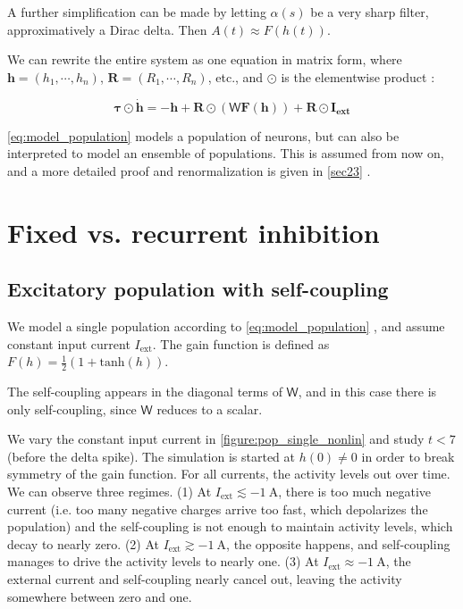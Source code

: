 \documentclass[10pt,conference,compsocconf,a4paper]{IEEEtran}
\renewcommand{\vec}[1]{\boldsymbol{#1}}
\newcommand{\nunit}[1]{\ \si{#1}}
\newcommand*{\shortautoref}[1]{%
	\begingroup
	\def\equationautorefname{\textsc{Eq.}}%
	\def\tableautorefname{\textsc{Tab.}}%
	\def\figureautorefname{\textsc{Fig.}}%
	\autoref{#1}%
	\endgroup
}
\begin{document}
	A further simplification can be made by letting $\alpha(s)$ be a very sharp filter, approximatively a Dirac delta. Then $A(t) \approx F(h(t))$.

	We can rewrite the entire system as one equation in matrix form, where $\vec h = (h_1, \cdots, h_n)$, $\vec R = (R_1, \cdots, R_n)$, etc., and $\odot$ is the elementwise product :

	\begin{equation} \label{eq:model_population}
		\vec{\tau} \odot \dot{\vec h} = -\vec h + \vec R \odot (\mathsf W \vec F(\vec h)) + \vec R \odot \vec{I_{\text{ext}}}
	\end{equation}

	\shortautoref{eq:model_population} models a population of neurons, but can also be interpreted to model an ensemble of populations. This is assumed from now on, and a more detailed proof and renormalization is given in \shortautoref{sec23}.

\section{Fixed vs. recurrent inhibition}
\label{sec1}

	\subsection{Excitatory population with self-coupling}
	\label{sec11}

		We model a single population according to \shortautoref{eq:model_population}, and assume constant input current $I_{\text{ext}}$. The gain function is defined as $F(h) = \frac 12 (1 + \mathrm{tanh}(h))$.
		
		The self-coupling appears in the diagonal terms of $\mathsf W$, and in this case there is only self-coupling, since $\mathsf W$ reduces to a scalar.

		We vary the constant input current in \shortautoref{figure:pop_single_nonlin} and study $t < 7$ (before the delta spike). The simulation is started at $h(0) \neq 0$ in order to break symmetry of the gain function. For all currents, the activity levels out over time. We can observe three regimes.
		(1) At $I_{\text{ext}} \lesssim -1 \nunit{\ampere}$, there is too much negative current (i.e. too many negative charges arrive too fast, which depolarizes the population) and the self-coupling is not enough to maintain activity levels, which decay to nearly zero.
		(2) At $I_{\text{ext}} \gtrsim -1 \nunit{\ampere}$, the opposite happens, and self-coupling manages to drive the activity levels to nearly one.
		(3) At $I_{\text{ext}} \approx -1 \nunit{\ampere}$, the external current and self-coupling nearly cancel out, leaving the activity somewhere between zero and one.
\end{document}
